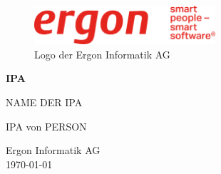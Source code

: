\begin{titlepage}

    \begin{figure}
        \begin{center}
            \includegraphics[width=0.6\textwidth]{ressourcen/ergon_logo_gross}
            \captionsetup{textformat=empty, labelformat=empty}
            \caption[Logo der Ergon Informatik AG~\parencite{ergonlogo}]{Logo der Ergon Informatik AG}\label{fig:ergon-logo-gross}
        \end{center}
    \end{figure}
    \begin{center}
        \vspace*{2cm}
        \Huge
        \textbf{IPA}

        \vspace{0.5cm}
        \Large
        NAME DER IPA

        \vfill

        \Large
        IPA von PERSON

        \vspace*{3cm}

        \large
        Ergon Informatik AG\\
        \today\\

    \end{center}
\end{titlepage}
